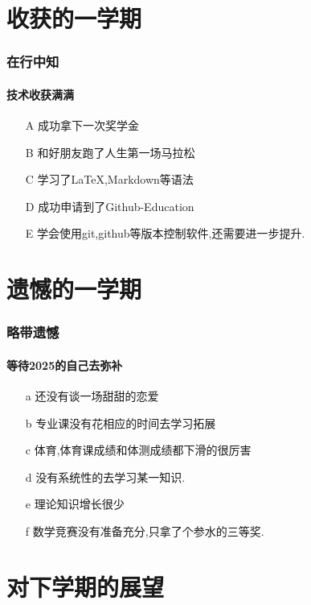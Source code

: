 \documentclass{beamer}
\begin{document}
	\section{收获的一学期}
	
	\begin{frame}
		\frametitle{在行中知}
		\framesubtitle{技术收获满满}
		\begin{itemize}[<+->]
			\item[A] 成功拿下一次奖学金
			\item[B] 和好朋友跑了人生第一场马拉松
			\item[C] 学习了\LaTeX,Markdown等语法
			\item[D] 成功申请到了Github-Education
			\item[E] 学会使用git,github等版本控制软件,还需要进一步提升.
		\end{itemize}
	\end{frame}
	
	\section{遗憾的一学期}
	
	\begin{frame}
		\frametitle{略带遗憾}
		\framesubtitle{等待2025的自己去弥补}
		\begin{itemize}[<+->]
			\item[a] 还没有谈一场甜甜的恋爱 
			\item[b] 专业课没有花相应的时间去学习拓展
			\item[c] 体育,体育课成绩和体测成绩都下滑的很厉害
			\item[d] 没有系统性的去学习某一知识.
			\item[e]  理论知识增长很少
			\item[f] 数学竞赛没有准备充分,只拿了个参水的三等奖.
 		\end{itemize}
	\end{frame}
	
	\section{对下学期的展望}
	
\end{document}
